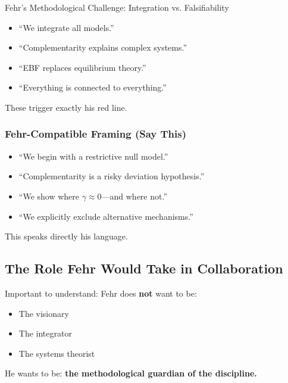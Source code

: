 \begin{chapter}{Fehr's Methodological Challenge: Integration vs. Falsifiability}
\begin{tcolorbox}[colback=red!5!white,colframe=red!75!black,title=\textbf{Phrases That Trigger Rejection}]
\begin{itemize}[noitemsep]
    \item ``We integrate all models.''
    \item ``Complementarity explains complex systems.''
    \item ``EBF replaces equilibrium theory.''
    \item ``Everything is connected to everything.''
\end{itemize}
These trigger exactly his red line.
\end{tcolorbox}

\subsubsection{Fehr-Compatible Framing (Say This)}

\begin{tcolorbox}[colback=green!5!white,colframe=green!75!black,title=\textbf{Phrases That Signal Methodological Rigor}]
\begin{itemize}[noitemsep]
    \item ``We begin with a restrictive null model.''
    \item ``Complementarity is a risky deviation hypothesis.''
    \item ``We show where $\gamma \approx 0$---and where not.''
    \item ``We explicitly exclude alternative mechanisms.''
\end{itemize}
This speaks directly his language.
\end{tcolorbox}

\subsection{The Role Fehr Would Take in Collaboration}

Important to understand: Fehr does \textbf{not} want to be:
\begin{itemize}[noitemsep]
    \item The visionary
    \item The integrator
    \item The systems theorist
\end{itemize}

He wants to be: \textbf{the methodological guardian of the discipline.}


\end{chapter}
